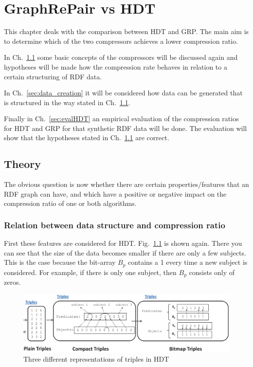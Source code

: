 \chapter{GraphRePair vs HDT}\label{ch:GRPvsHDT}

This chapter deals with the comparison between HDT and GRP. The main aim is to determine which of the two compressors achieves a lower compression ratio.

In Ch.~\ref{sec:theory} some basic concepts of the compressors will be discussed again and hypotheses will be made how the compression rate behaves in relation to a certain structuring of RDF data. 

In Ch.~\ref{sec:data_creation} it will be considered how data can be generated that is structured in the way stated in Ch.~\ref{sec:theory}.

Finally in Ch.~\ref{sec:evalHDT} an empirical evaluation of the compression ratios for HDT and GRP for that synthetic RDF data will be done. The evaluation will show that the hypotheses stated in Ch.~\ref{sec:theory} are correct.

\section{Theory}\label{sec:theory}
The obvious question is now whether there are certain properties/features that an RDF graph can have, and which have a positive or negative impact on the compression ratio of one or both algorithms. 

\subsection{Relation between data structure and compression ratio}

First these features are considered for HDT. Fig.~\ref{fig:hdt_overview_1} is shown again. There you can see that the size of the data becomes smaller if there are only a few subjects. This is the case because the bit-array $B_p$ contains a 1 every time a new subject is considered. For example, if there is only one subject, then $B_p$ consists only of zeros.

\begin{figure}[h]
	\centering
	\includegraphics[width=1\textwidth]{figures/relatedwork/hdt1}
	\caption{Three different representations of triples in HDT}
	\label{fig:hdt_overview_1}
\end{figure}

